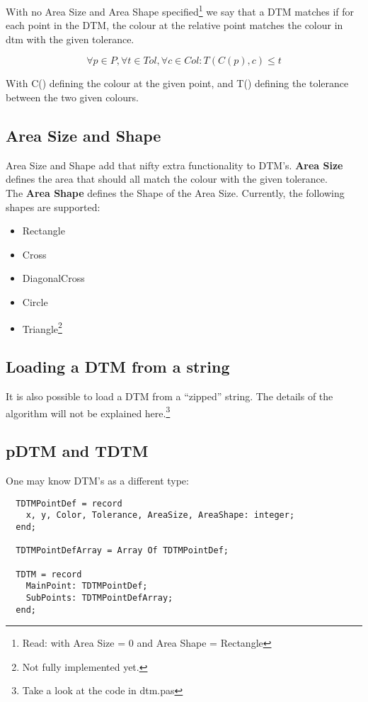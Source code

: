 \documentclass[a4paper, 10pt]{report} %
\begin{document}
With no Area Size and Area Shape specified\footnote{Read: with Area
Size = 0 and Area Shape = Rectangle} we say that a DTM matches if for each
point in the DTM, the colour at the relative point matches the colour in dtm
with the given tolerance.

$$ \forall p \in P, \forall t \in Tol, \forall c \in Col : T(C(p), c) \leq t $$

With C() defining the colour at the given point, and T() defining the tolerance
between the two given colours.

\subsection{Area Size and Shape}

Area Size and Shape add that nifty extra functionality to DTM's.
\textbf{Area Size} defines the area that should all match the colour with the given
tolerance. \\

The \textbf{Area Shape} defines the Shape of the Area Size.
Currently, the following shapes are supported:
\begin{itemize}
	\item Rectangle
	\item Cross
	\item DiagonalCross
	\item Circle
	\item Triangle\footnote{Not fully implemented yet.}
\end{itemize}

\subsection{Loading a DTM from a string}

It is also possible to load a DTM from a ``zipped'' string.
The details of the algorithm will not be explained here.\footnote{Take
a look at the code in dtm.pas}

\subsection{pDTM and TDTM}

One may know DTM's as a different type:

\begin{verbatim}
  TDTMPointDef = record
    x, y, Color, Tolerance, AreaSize, AreaShape: integer;
  end;

  TDTMPointDefArray = Array Of TDTMPointDef;

  TDTM = record
    MainPoint: TDTMPointDef;
    SubPoints: TDTMPointDefArray;
  end;    
\end{verbatim}
\end{document}
